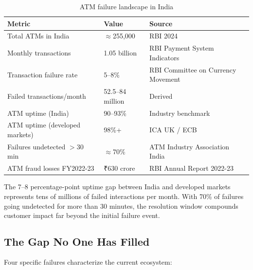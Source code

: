 \documentclass[11pt,a4paper]{article}
\newcommand{\inr}{₹}
\begin{document}
\begin{table}[H]
\centering
\small
\caption{ATM failure landscape in India}
\label{tab:scale}
\begin{tabular}{@{}lll@{}}
\toprule
\textbf{Metric} & \textbf{Value} & \textbf{Source} \\
\midrule
Total ATMs in India        & $\approx$255,000            & RBI 2024 \citep{rbi2024} \\
Monthly transactions       & 1.05 billion                & RBI Payment System Indicators \citep{rbipsi} \\
Transaction failure rate   & 5--8\%                      & RBI Committee on Currency Movement \citep{rbicircular} \\
Failed transactions/month  & 52.5--84 million            & Derived \\
ATM uptime (India)         & 90--93\%                    & Industry benchmark \citep{atmia2023} \\
ATM uptime (developed markets) & 98\%+               & ICA UK / ECB \citep{ecb} \\
Failures undetected $>$30 min & $\approx$70\%           & ATM Industry Association India \citep{atmia2023} \\
ATM fraud losses FY2022-23 & \inr{}630 crore             & RBI Annual Report 2022-23 \citep{rbi2023} \\
\bottomrule
\end{tabular}
\end{table}

The 7--8 percentage-point uptime gap between India and developed markets represents tens of millions of failed interactions per month. With 70\% of failures going undetected for more than 30 minutes, the resolution window compounds customer impact far beyond the initial failure event.

\subsection{The Gap No One Has Filled}

Four specific failures characterize the current ecosystem:
\end{document}
